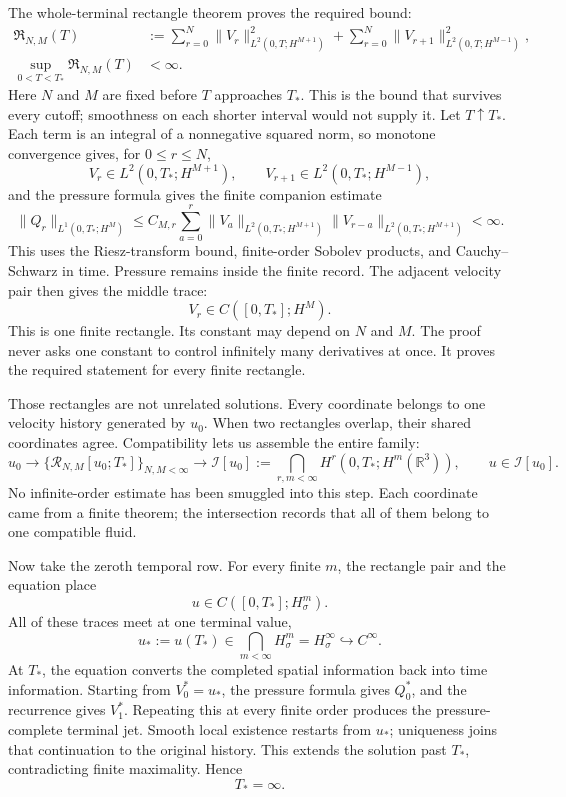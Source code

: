 The whole-terminal rectangle theorem proves the required bound:
\[
\begin{aligned}
\mathfrak R_{N,M}(T)
&:=\sum_{r=0}^{N}
\|V_r\|_{L^2(0,T;H^{M+1})}^{2}+
\sum_{r=0}^{N}
\|V_{r+1}\|_{L^2(0,T;H^{M-1})}^{2},\\
\sup_{0<T<T_*}\mathfrak R_{N,M}(T)&<\infty.
\end{aligned}
\]
Here \(N\) and \(M\) are fixed before \(T\) approaches \(T_*\).  This is
the bound that survives every cutoff; smoothness on each shorter interval
would not supply it.  Let \(T\uparrow T_*\).  Each term is an integral of a
nonnegative squared norm, so monotone convergence gives, for
\(0\le r\le N\),
\[
V_r\in L^2(0,T_*;H^{M+1}),
\qquad
V_{r+1}\in L^2(0,T_*;H^{M-1}),
\]
and the pressure formula gives the finite companion estimate
\[
\|Q_r\|_{L^1(0,T_*;H^M)}
\leq C_{M,r}\sum_{a=0}^{r}
\|V_a\|_{L^2(0,T_*;H^{M+1})}
\|V_{r-a}\|_{L^2(0,T_*;H^{M+1})}<\infty.
\]
This uses the Riesz-transform bound, finite-order Sobolev products, and
Cauchy--Schwarz in time.  Pressure remains inside the finite record.
The adjacent velocity pair then gives the middle trace:
\[
V_r\in C([0,T_*];H^M).
\]
This is one finite rectangle.  Its constant may depend on \(N\) and \(M\).
The proof never asks one constant to control infinitely many derivatives at
once.  It proves the required statement for every finite rectangle.

Those rectangles are not unrelated solutions.  Every coordinate belongs to
one velocity history generated by \(u_0\).  When two rectangles overlap, their
shared coordinates agree.  Compatibility lets us assemble the entire family:
\[
u_0
\longrightarrow
\{\mathcal R_{N,M}[u_0;T_*]\}_{N,M<\infty}
\longrightarrow
\mathcal I[u_0]
:=\bigcap_{r,m<\infty}H^r(0,T_*;H^m(\mathbb R^3)),
\qquad
u\in\mathcal I[u_0].
\]
No infinite-order estimate has been smuggled into this step.  Each coordinate
came from a finite theorem; the intersection records that all of them belong
to one compatible fluid.

Now take the zeroth temporal row.  For every finite \(m\), the rectangle pair
and the equation place
\[
u\in C([0,T_*];H^m_\sigma).
\]
All of these traces meet at one terminal value,
\[
u_*:=u(T_*)
\in\bigcap_{m<\infty}H^m_\sigma
=H^\infty_\sigma
\hookrightarrow C^\infty.
\]
At \(T_*\), the equation converts the completed spatial information back into
time information.  Starting from \(V_0^*=u_*\), the pressure formula gives
\(Q_0^*\), and the recurrence gives \(V_1^*\).  Repeating this at every finite
order produces the pressure-complete terminal jet.  Smooth local existence
restarts from \(u_*\); uniqueness joins that continuation to the original
history.  This extends the solution past \(T_*\), contradicting finite
maximality.  Hence
\[
T_*=\infty.
\]

